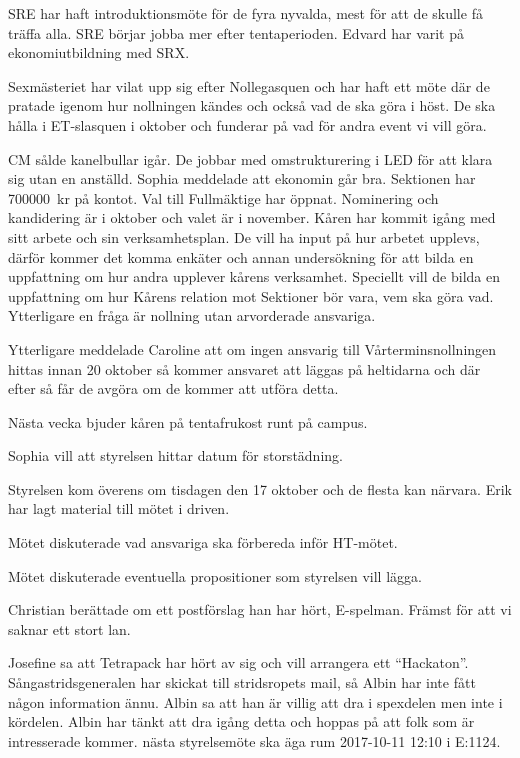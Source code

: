 \documentclass[10pt]{article}
\begin{document}
\begin{paragrafer}
\begin{paragrafer}
SRE har haft introduktionsmöte för de fyra nyvalda, mest för att de skulle få träffa alla. SRE börjar jobba mer efter tentaperioden. Edvard har varit på ekonomiutbildning med SRX.

Sexmästeriet har vilat upp sig efter Nollegasquen och har haft ett möte där de pratade igenom hur nollningen kändes och också vad de ska göra i höst. De ska hålla i ET-slasquen i oktober och funderar på vad för andra event vi vill göra.

CM sålde kanelbullar igår. De jobbar med omstrukturering i LED för att klara sig utan en anställd.
Sophia meddelade att ekonomin går bra. Sektionen har \SI{700000}{kr} på kontot.
Val till Fullmäktige har öppnat. Nominering och kandidering är i oktober och valet är i november. Kåren har kommit igång med sitt arbete och sin verksamhetsplan. De vill ha input på hur arbetet upplevs, därför kommer det komma enkäter och annan undersökning för att bilda en uppfattning om hur andra upplever kårens verksamhet. Speciellt vill de bilda en uppfattning om hur Kårens relation mot Sektioner bör vara, vem ska göra vad. Ytterligare en fråga är nollning utan arvorderade ansvariga.

Ytterligare meddelade Caroline att om ingen ansvarig till Vårterminsnollningen hittas innan 20 oktober så kommer ansvaret att läggas på heltidarna och där efter så får de avgöra om de kommer att utföra detta.

Nästa vecka bjuder kåren på tentafrukost runt på campus.
\end{paragrafer}

Sophia vill att styrelsen hittar datum för storstädning.

Styrelsen kom överens om tisdagen den 17 oktober och de flesta kan närvara.
Erik har lagt material till mötet i driven.

Mötet diskuterade vad ansvariga ska förbereda inför HT-mötet.

Mötet diskuterade eventuella propositioner som styrelsen vill lägga.

Christian berättade om ett postförslag han har hört, E-spelman. Främst för att vi saknar ett stort lan.

Josefine sa att Tetrapack har hört av sig och vill arrangera ett ``Hackaton''.
Sångastridsgeneralen har skickat till stridsropets mail, så Albin har inte fått någon information ännu. Albin sa att han är villig att dra i spexdelen men inte i kördelen. Albin har tänkt att dra igång detta och hoppas på att folk som är intresserade kommer.
{\Mba} nästa styrelsemöte ska äga rum 2017-10-11 12:10 i E:1124.


\end{paragrafer}
\end{document}
